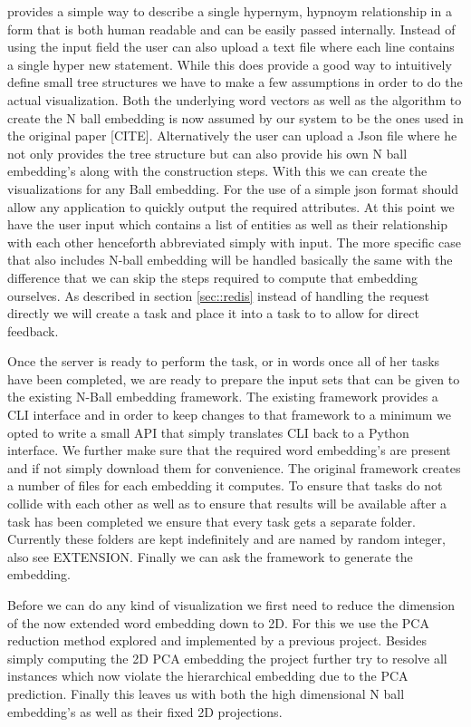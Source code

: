 \documentclass[]{article}
\begin{document}
provides a simple way to describe a single hypernym, hypnoym relationship in a form that is both human readable and can be easily passed internally. Instead of using the input field the user can also upload a text file where each line contains a single hyper new statement. While this does provide a good way to intuitively define small tree structures we have to make a few assumptions in order to do the actual visualization. Both the underlying word vectors as well as the algorithm to create the N ball embedding is now assumed by our system to be the ones used in the original paper [CITE]. Alternatively the user can upload a Json file where he not only provides the tree structure but can also provide his own N ball embedding's along with the construction steps. With this we can create the visualizations for any Ball embedding. For the use of a simple json format should allow any application to quickly output the required attributes. 
At this point we have the user input which contains a list of entities as well as their relationship with each other henceforth abbreviated simply with input. The more specific case that also includes N-ball embedding will be handled basically the same with the difference that we can skip the steps required to compute that embedding ourselves. As described in section \ref{sec::redis} instead of handling the request directly we will create a task and place it into a task to to allow for direct feedback.  

Once the server is ready to perform the task, or in words once all of her tasks have been completed, we are ready to prepare the input sets that can be given to the existing N-Ball embedding framework. The existing framework provides a CLI interface and in order to keep changes to that framework to a minimum we opted to write a small API that simply translates CLI back to a Python interface. We further make sure that the required word embedding's are present and if not simply download them for convenience. The original framework creates a number of files for each embedding it computes. To ensure that tasks do not collide with each other as well as to ensure that results will be available after a task has been completed we ensure that every task gets a separate folder. Currently these folders are kept indefinitely and are named by random integer, also see EXTENSION. Finally we can ask the framework to generate the embedding.

Before we can do any kind of visualization we first need to reduce the dimension of the now extended word embedding down to 2D. For this we use the PCA reduction method explored and implemented by a previous project. Besides simply computing the 2D PCA embedding the project further try to resolve all instances which now violate the hierarchical embedding due to the PCA prediction. Finally this leaves us with both the high dimensional N ball embedding's as well as their fixed 2D projections.
\end{document}
